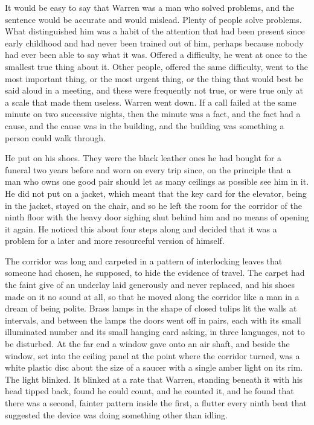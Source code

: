 It would be easy to say that Warren was a man who solved problems, and the sentence would be accurate and would mislead. Plenty of people solve problems. What distinguished him was a habit of the attention that had been present since early childhood and had never been trained out of him, perhaps because nobody had ever been able to say what it was. Offered a difficulty, he went at once to the smallest true thing about it. Other people, offered the same difficulty, went to the most important thing, or the most urgent thing, or the thing that would best be said aloud in a meeting, and these were frequently not true, or were true only at a scale that made them useless. Warren went down. If a call failed at the same minute on two successive nights, then the minute was a fact, and the fact had a cause, and the cause was in the building, and the building was something a person could walk through.

He put on his shoes. They were the black leather ones he had bought for a funeral two years before and worn on every trip since, on the principle that a man who owns one good pair should let as many ceilings as possible see him in it. He did not put on a jacket, which meant that the key card for the elevator, being in the jacket, stayed on the chair, and so he left the room for the corridor of the ninth floor with the heavy door sighing shut behind him and no means of opening it again. He noticed this about four steps along and decided that it was a problem for a later and more resourceful version of himself.

The corridor was long and carpeted in a pattern of interlocking leaves that someone had chosen, he supposed, to hide the evidence of travel. The carpet had the faint give of an underlay laid generously and never replaced, and his shoes made on it no sound at all, so that he moved along the corridor like a man in a dream of being polite. Brass lamps in the shape of closed tulips lit the walls at intervals, and between the lamps the doors went off in pairs, each with its small illuminated number and its small hanging card asking, in three languages, not to be disturbed. At the far end a window gave onto an air shaft, and beside the window, set into the ceiling panel at the point where the corridor turned, was a white plastic disc about the size of a saucer with a single amber light on its rim. The light blinked. It blinked at a rate that Warren, standing beneath it with his head tipped back, found he could count, and he counted it, and he found that there was a second, fainter pattern inside the first, a flutter every ninth beat that suggested the device was doing something other than idling.

